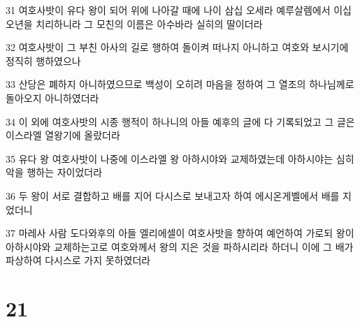 \par 31 여호사밧이 유다 왕이 되어 위에 나아갈 때에 나이 삼십 오세라 예루살렘에서 이십 오년을 치리하니라 그 모친의 이름은 아수바라 실히의 딸이더라
\par 32 여호사밧이 그 부친 아사의 길로 행하여 돌이켜 떠나지 아니하고 여호와 보시기에 정직히 행하였으나
\par 33 산당은 폐하지 아니하였으므로 백성이 오히려 마음을 정하여 그 열조의 하나님께로 돌아오지 아니하였더라
\par 34 이 외에 여호사밧의 시종 행적이 하나니의 아들 예후의 글에 다 기록되었고 그 글은 이스라엘 열왕기에 올랐더라
\par 35 유다 왕 여호사밧이 나중에 이스라엘 왕 아하시야와 교제하였는데 아하시야는 심히 악을 행하는 자이었더라
\par 36 두 왕이 서로 결합하고 배를 지어 다시스로 보내고자 하여 에시온게벨에서 배를 지었더니
\par 37 마레사 사람 도다와후의 아들 엘리에셀이 여호사밧을 향하여 예언하여 가로되 왕이 아하시야와 교제하는고로 여호와께서 왕의 지은 것을 파하시리라 하더니 이에 그 배가 파상하여 다시스로 가지 못하였더라

\chapter{21}


